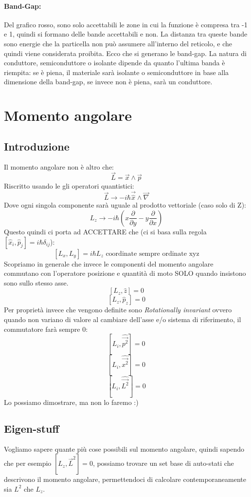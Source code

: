 \paragraph{Band-Gap:} 
Del grafico rosso, sono solo accettabili le zone in cui la funzione è compresa tra -1 e 1, quindi si formano delle bande accettabili e non. La distanza tra queste bande sono energie che la particella non può assumere all'interno del reticolo, e che quindi viene considerata proibita. Ecco che si generano le band-gap. La natura di conduttore, semiconduttore o isolante dipende da quanto l'ultima banda è riempita: se è piena, il materiale sarà isolante o semiconduttore in base alla dimensione della band-gap, se invece non è piena, sarà un conduttore.


\section{Momento angolare}

\subsection{Introduzione}

Il momento angolare non è altro che:
$$\vec{L} = \vec{x} \wedge \vec{p} $$
Riscritto usando le gli operatori quantistici:
$$\vec{L} \rightarrow -i\hbar\vec{\hat{x}} \wedge \vec{\nabla}$$
Dove ogni singola componente sarà uguale al prodotto vettoriale (caso solo di Z):
$$L_z \rightarrow -i\hbar\left( x\frac{\partial}{\partial y} - y \frac{\partial}{\partial x}\right)$$
Questo quindi ci porta ad ACCETTARE che (ci si basa sulla regola $[\hat{x}_i, \hat{p}_j] = i\hbar\delta_{ij}$):
$$[L_x, L_y] = i\hbar L_z \text{ coordinate sempre ordinate xyz}$$
Scopriamo in generale che invece le componenti del momento angolare commutano con l'operatore posizione e quantità di moto SOLO quando insistono sono sullo stesso asse.
$$[L_z, \hat{z}] = 0$$
$$[L_z, \hat{p}_z] = 0$$
Per proprietà invece che vengono definite sono \textit{Rotationally invariant} ovvero quando non variano di valore al cambiare dell'asse e/o sistema di riferimento, il commutatore farà sempre 0:
$$[L_i, \hat{\vec{p^2}}] = 0$$
$$[L_i, \hat{\vec{x^2}}] = 0$$
$$[L_i, \hat{\vec{L^2}}] = 0$$
Lo possiamo dimostrare, ma non lo faremo :)

\subsection{Eigen-stuff}

Vogliamo sapere quante più cose possibili sul momento angolare, quindi sapendo che per esempio $[L_z, \vec{L}^2] = 0$, possiamo trovare un set base di auto-stati che descrivono il momento angolare, permettendoci di calcolare contemporaneamente sia $L^2$ che $L_z$.

